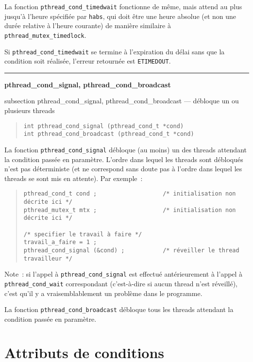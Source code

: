 \documentclass [twoside] {report}
\newcommand {\primitive} [1]
    {
	{\large \bf #1}
	\addcontentsline {toc} {subsection} {#1}
    }
\newcommand {\separation}
    {
	\vspace {7mm}
	\nopagebreak
	\hrule
    }
\begin{document}
La fonction \verb|pthread_cond_timedwait| fonctionne de même, mais
attend au plus jusqu'à l'heure spécifiée par \texttt {habs}, qui doit
être une heure absolue (et non une durée relative à l'heure courante)
de manière similaire à \verb|pthread_mutex_timedlock|.

Si \verb|pthread_cond_timedwait| se termine à l'expiration du délai
sans que la condition soit réalisée, l'erreur retournée est \texttt
{ETIMEDOUT}.


\separation
\primitive {pthread\_cond\_signal, pthread\_cond\_broadcast} --- débloque un ou plusieurs threads

\begin {quote}
\begin {verbatim}
int pthread_cond_signal (pthread_cond_t *cond)
int pthread_cond_broadcast (pthread_cond_t *cond)
\end{verbatim}
\end {quote}

La fonction \verb|pthread_cond_signal| débloque (au moins) un des threads
attendant la condition passée en paramètre. L'ordre dans lequel les
threads sont débloqués n'est pas déterministe (et ne correspond sans
doute pas à l'ordre dans lequel les threads se sont mis en attente).
Par exemple~:

\begin {quote}
\small
\begin {verbatim}
pthread_cond_t cond ;                   /* initialisation non décrite ici */
pthread_mutex_t mtx ;                   /* initialisation non décrite ici */

/* specifier le travail à faire */
travail_a_faire = 1 ;
pthread_cond_signal (&cond) ;           /* réveiller le thread travailleur */
\end{verbatim}
\end {quote}

Note~: si l'appel à \verb|pthread_cond_signal| est effectué
antérieurement à l'appel à \verb|pthread_cond_wait| correspondant
(c'est-à-dire si aucun thread n'est réveillé), c'est qu'il y a
vraisemblablement un problème dans le programme.

La fonction \verb|pthread_cond_broadcast| débloque tous les threads
attendant la condition passée en paramètre.


\section {Attributs de conditions}
\end{document}
